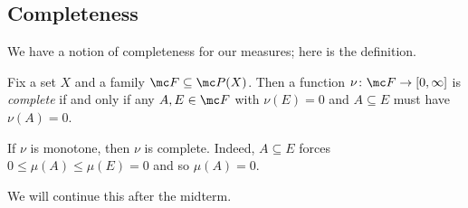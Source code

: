 \documentclass[../notes.tex]{subfiles}
\begin{document}
\subsection{Completeness}
We have a notion of completeness for our measures; here is the definition.
\begin{definition}[Compelete]
	Fix a set $X$ and a family $\mc F\subseteq\mc P(X)$. Then a function $\nu\colon\mc F\to[0,\infty]$ is \textit{complete} if and only if any $A,E\in\mc F$ with $\nu(E)=0$ and $A\subseteq E$ must have $\nu(A)=0$.
\end{definition}
\begin{example}
	If $\nu$ is monotone, then $\nu$ is complete. Indeed, $A\subseteq E$ forces $0\le\mu(A)\le\mu(E)=0$ and so $\mu(A)=0$.
\end{example}
We will continue this after the midterm.
\end{document}
